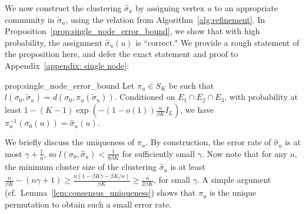\documentclass{article}
\begin{document}
We now construct the clustering $\hat \sigma_u$ by assigning vertex $u$ to an appropriate community in $\tilde \sigma_u$, using the relation from Algorithm~\ref{alg:refinement}.
In Proposition~\ref{prop:single_node_error_bound}, we show that with high probability, the assignment $\hat \sigma_u(u)$ is ``correct." We provide a rough statement of  the proposition here, and defer the exact statement and proof to Appendix~\ref{appendix: single node}:
\begin{repproposition}{prop:single_node_error_bound}
Let $\pi_u \in S_K$ be such that $l(\sigma_0, \tilde \sigma_u) = d(\sigma_0, \pi_u(\tilde \sigma_u)).$ Conditioned on $E_1 \cap E_2 \cap E_3$, with probability at least $1 - (K-1)\exp \left( - (1 - o(1)) \frac{n}{\beta K} I_L \right)$, we have $\pi_u^{-1}(\sigma_0(u)) = \hat \sigma_u(u).$
\end{repproposition}
We briefly discuss the uniqueness of $\pi_u$. By construction, the error rate of $\hat{\sigma}_u$ is at most $ \gamma + \frac{1}{n}$, so $l(\sigma_0, \hat{\sigma}_u) < \frac{1}{8 \beta K}$ for sufficiently small $\gamma$.
Now note that for any $u$, the minimum cluster size of the clustering $\hat{\sigma}_u$ is at least $\frac{n}{\beta K} - (n \gamma + 1) \geq \frac{ n(1 - \beta K \gamma  - \beta K/n)}{\beta K} \geq \frac{n}{2\beta K}$, for small $\gamma$. A simple argument (cf.\ Lemma~\ref{lem:consensus_uniqueness}) shows that $\pi_u$ is the unique permutation to obtain such a small error rate.
\end{document}

